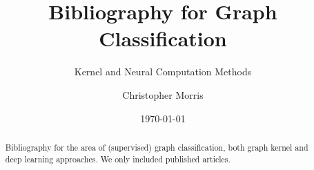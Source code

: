 \documentclass[	
	paper = a4,
	fontsize = 10pt,
	DIV = 12,
	abstract = true
]{scrartcl}
\theoremstyle{plain}
\theoremstyle{definition}
\begin{document}
\title{Bibliography for Graph Classification}
\subtitle{Kernel and Neural Computation Methods}

\renewcommand\Affilfont{\large}
\renewcommand\Authfont{\large}
\setlength{\affilsep}{0.5em}
\author[*]{Christopher Morris}
\date{\vspace*{-1.0em}\small\today\vspace*{-1.0em}}

\maketitle

\begin{abstract}
Bibliography for the area of (supervised) graph classification, both graph kernel and deep learning approaches. We only included published articles.
\end{abstract}

\nocite{*}


\printbibliography[keyword=deep, title={Deep Learning}]
\printbibliography[keyword=kernel, title={Kernel Methods}]
\end{document}
